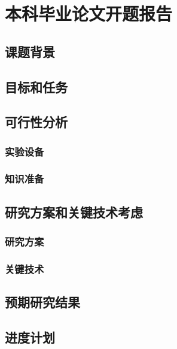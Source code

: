 \chapter{本科毕业论文开题报告}

\section{课题背景}
\section{目标和任务}

\section{可行性分析}
\subsection{实验设备}

\subsection{知识准备}
\section{研究方案和关键技术考虑}
\subsection{研究方案}

\subsection{关键技术}
\section{预期研究结果}
\section{进度计划}
